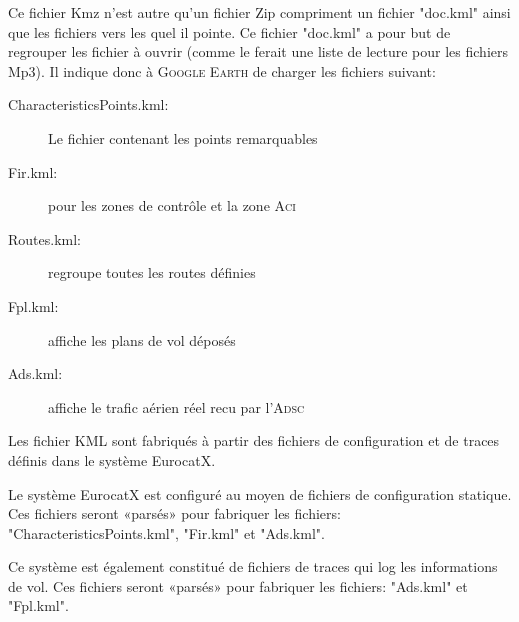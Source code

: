 Ce fichier Kmz n'est autre qu'un fichier Zip compriment un fichier "doc.kml" ainsi que les fichiers vers les quel il pointe. Ce fichier "doc.kml" a pour but de regrouper les fichier à ouvrir (comme le ferait une liste de lecture pour les fichiers Mp3). Il indique donc à \textsc{Google Earth} de charger les fichiers suivant:
\begin{description}
\item[CharacteristicsPoints.kml:] Le fichier contenant les points remarquables
\item[Fir.kml:] pour les zones de contrôle et la zone \textsc{Aci} 
\item[Routes.kml:] regroupe toutes les routes définies
\item[Fpl.kml:] affiche les plans de vol déposés
\item[Ads.kml:] affiche le trafic aérien réel recu par l'\textsc{Adsc}
\end{description}\medskip

Les fichier KML sont fabriqués à partir des fichiers de configuration et de traces définis dans le système EurocatX. 

Le système EurocatX est configuré au moyen de fichiers de configuration statique. Ces fichiers seront «parsés» pour fabriquer les fichiers: "CharacteristicsPoints.kml", "Fir.kml" et "Ads.kml".

Ce système est également constitué de fichiers de traces qui log les informations de vol. Ces fichiers seront «parsés» pour fabriquer les fichiers: "Ads.kml" et "Fpl.kml".

